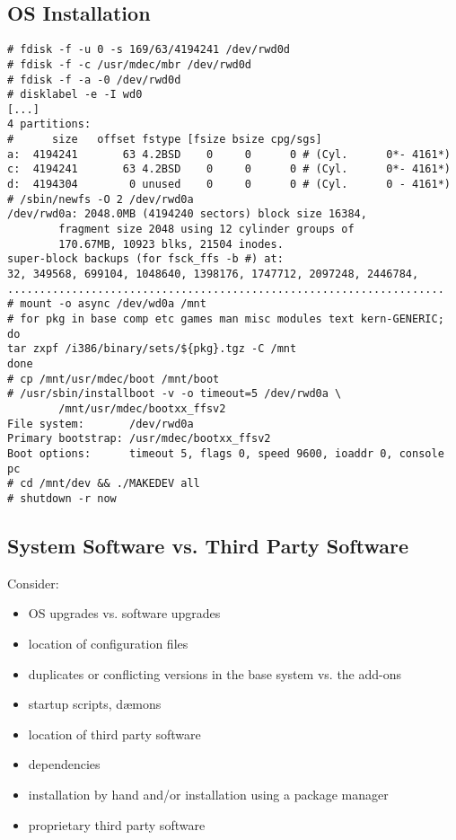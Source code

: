 \documentclass[xga]{xdvislides}
\begin{document}
\subsection{OS Installation}
\small
\begin{verbatim}
# fdisk -f -u 0 -s 169/63/4194241 /dev/rwd0d
# fdisk -f -c /usr/mdec/mbr /dev/rwd0d
# fdisk -f -a -0 /dev/rwd0d
# disklabel -e -I wd0
[...]
4 partitions:
#      size   offset fstype [fsize bsize cpg/sgs]
a:  4194241       63 4.2BSD    0     0      0 # (Cyl.      0*- 4161*)
c:  4194241       63 4.2BSD    0     0      0 # (Cyl.      0*- 4161*)
d:  4194304        0 unused    0     0      0 # (Cyl.      0 - 4161*)
# /sbin/newfs -O 2 /dev/rwd0a
/dev/rwd0a: 2048.0MB (4194240 sectors) block size 16384,
        fragment size 2048 using 12 cylinder groups of
        170.67MB, 10923 blks, 21504 inodes.
super-block backups (for fsck_ffs -b #) at:
32, 349568, 699104, 1048640, 1398176, 1747712, 2097248, 2446784,
....................................................................
# mount -o async /dev/wd0a /mnt
# for pkg in base comp etc games man misc modules text kern-GENERIC; do
tar zxpf /i386/binary/sets/${pkg}.tgz -C /mnt
done
# cp /mnt/usr/mdec/boot /mnt/boot
# /usr/sbin/installboot -v -o timeout=5 /dev/rwd0a \
        /mnt/usr/mdec/bootxx_ffsv2
File system:       /dev/rwd0a
Primary bootstrap: /usr/mdec/bootxx_ffsv2
Boot options:      timeout 5, flags 0, speed 9600, ioaddr 0, console pc
# cd /mnt/dev && ./MAKEDEV all
# shutdown -r now
\end{verbatim}
\Normalsize

\subsection{System Software vs. Third Party Software}
Consider:
\begin{itemize}
	\item OS upgrades vs. software upgrades
	\item location of configuration files
	\item duplicates or conflicting versions in the base system vs. the
		add-ons
	\item startup scripts, d{\ae}mons
	\item location of third party software
	\item dependencies
	\item installation by hand and/or installation using a package manager
	\item proprietary third party software
\end{itemize}
\end{document}
